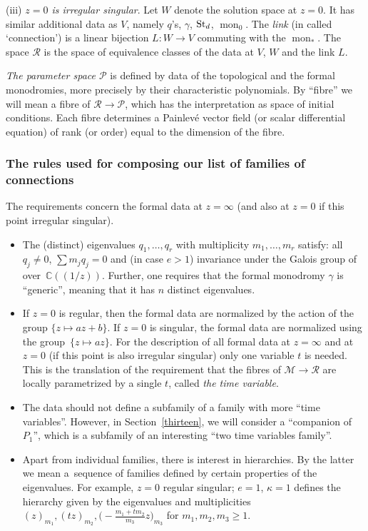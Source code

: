 \documentclass[10pt,a4paper]{amsart}
\numberwithin{equation}{section}
\begin{document}
 (iii) {\it $z=0$ is irregular singular}. Let $W$ denote the solution space at $z=0$. It has similar additional data as $V$, namely $q$'s,
$\gamma$, ${\rm St}_d$, $\operatorname{mon}_0$. The {\it link} (in \cite{J-M-U} called `connection') is a linear bijection $L\colon W\rightarrow V$ commuting with
the $\operatorname{mon}_*$. The space $\mathcal{R}$ is the space of equivalence classes of the data at $V$, $W$ and the link $L$.


{\it The parameter space $\mathcal{P}$} is defined by data of the topological and the formal monodromies, more precisely
by their characteristic polynomials. By ``fibre'' we will mean a fibre of $\mathcal{R}\rightarrow \mathcal{P}$,
which has the interpretation as space of initial conditions. Each fibre determines a Painlev\'e vector field
(or scalar differential equation) of rank (or order) equal to the dimension of the fibre.

\subsubsection{The rules used for composing our list of families of connections}
The requirements concern the formal data at $z=\infty$ (and also at $z=0$ if this point irregular singular).
\begin{itemize}\itemsep=0pt
\item[R1.] The (distinct) eigenvalues $q_1,\dots , q_r$ with multiplicity $m_1,\dots ,m_r$
 satisfy: all $q_j\neq 0$, $\sum m_j q_j=0$ and (in case $e>1$) invariance under the Galois group of 
over~${\mathbb{C}(\!(1/z)\!)}$.
 Further, one requires that the formal monodromy $\gamma$ is ``generic'', meaning that it has $n$ distinct eigenvalues.

 \item[R2.] If $z=0$ is regular, then the formal data are normalized by the action of the group $\{z\mapsto az+b\}$. If $z=0$ is singular,
 the formal data are normalized using the group~${\{z\mapsto az\}}$. For the description of all formal data at $z=\infty$ and at $z=0$ (if this point is also irregular singular) only one variable $t$ is needed. This is the translation of the requirement that the fibres of $\mathcal{M}\rightarrow \mathcal{R}$ are locally parametrized by a single $t$, called {\it the time variable}.

 \item[R3.] The data should not define a subfamily of a family with more ``time variables''. However, in Section~\ref{thirteen}, we will consider
 a ``companion of $ P_1$'', which is a subfamily of an interesting ``two time variables family''.

 \item[R4.] Apart from individual families, there is interest in hierarchies. By the latter we mean a~sequence of families defined by certain properties of the eigenvalues. For example, $z=0$ regular singular; $e=1$, $\kappa =1$ defines the hierarchy given by the eigenvalues and multiplicities
 $ (z)_{m_1}, (tz)_{m_2}, \bigl( -\frac{m_1+tm_2}{m_3}z\bigr)_{m_3}$ for $m_1,m_2,m_3\geq 1$.
 \end{itemize}
\end{document}
